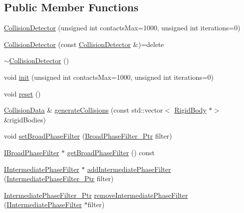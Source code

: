 \subsection*{Public Member Functions}
\begin{DoxyCompactItemize}
\item 
\mbox{\hyperlink{classr3_1_1_collision_detector_ad5754f8b7105f7d0c2a534bee681cd6d}{Collision\+Detector}} (unsigned int contacts\+Max=1000, unsigned int iterations=0)
\item 
\mbox{\hyperlink{classr3_1_1_collision_detector_ad44d67dd15e661d0e135016c89a7c9a4}{Collision\+Detector}} (const \mbox{\hyperlink{classr3_1_1_collision_detector}{Collision\+Detector}} \&)=delete
\item 
\mbox{\hyperlink{classr3_1_1_collision_detector_ab45ac57f6ab9bcab367e104e9423722a}{$\sim$\+Collision\+Detector}} ()
\item 
void \mbox{\hyperlink{classr3_1_1_collision_detector_acaa771728b3edcf398724f0295151eb4}{init}} (unsigned int contacts\+Max=1000, unsigned int iterations=0)
\item 
void \mbox{\hyperlink{classr3_1_1_collision_detector_a8f9f9e0ecc67d950e79d024803dc916b}{reset}} ()
\item 
\mbox{\hyperlink{classr3_1_1_collision_data}{Collision\+Data}} \& \mbox{\hyperlink{classr3_1_1_collision_detector_a58a1bd9705f241e4c137458bed35f596}{generate\+Collisions}} (const std\+::vector$<$ \mbox{\hyperlink{classr3_1_1_rigid_body}{Rigid\+Body}} $\ast$$>$ \&rigid\+Bodies)
\item 
void \mbox{\hyperlink{classr3_1_1_collision_detector_a2184ca2db73a6446cf028e3b742c7cc4}{set\+Broad\+Phase\+Filter}} (\mbox{\hyperlink{classr3_1_1_collision_detector_aa8ed51d53c6f6ce545c93ad0e356d6de}{Broad\+Phase\+Filter\+\_\+\+Ptr}} filter)
\item 
\mbox{\hyperlink{classr3_1_1_i_broad_phase_filter}{I\+Broad\+Phase\+Filter}} $\ast$ \mbox{\hyperlink{classr3_1_1_collision_detector_aa4d1c9560f806496b2215ddc623a1387}{get\+Broad\+Phase\+Filter}} () const
\item 
\mbox{\hyperlink{classr3_1_1_i_intermediate_phase_filter}{I\+Intermediate\+Phase\+Filter}} $\ast$ \mbox{\hyperlink{classr3_1_1_collision_detector_a804d66d43502a2b113aa1e8c302cebc7}{add\+Intermediate\+Phase\+Filter}} (\mbox{\hyperlink{classr3_1_1_collision_detector_a8337c2c23ec77350b65977e043c07827}{Intermediate\+Phase\+Filter\+\_\+\+Ptr}} filter)
\item 
\mbox{\hyperlink{classr3_1_1_collision_detector_a8337c2c23ec77350b65977e043c07827}{Intermediate\+Phase\+Filter\+\_\+\+Ptr}} \mbox{\hyperlink{classr3_1_1_collision_detector_aff67a43ffc0f74ada2193f46aa3ea1fd}{remove\+Intermediate\+Phase\+Filter}} (\mbox{\hyperlink{classr3_1_1_i_intermediate_phase_filter}{I\+Intermediate\+Phase\+Filter}} $\ast$filter)
$$
\end{DoxyCompactItemize}
